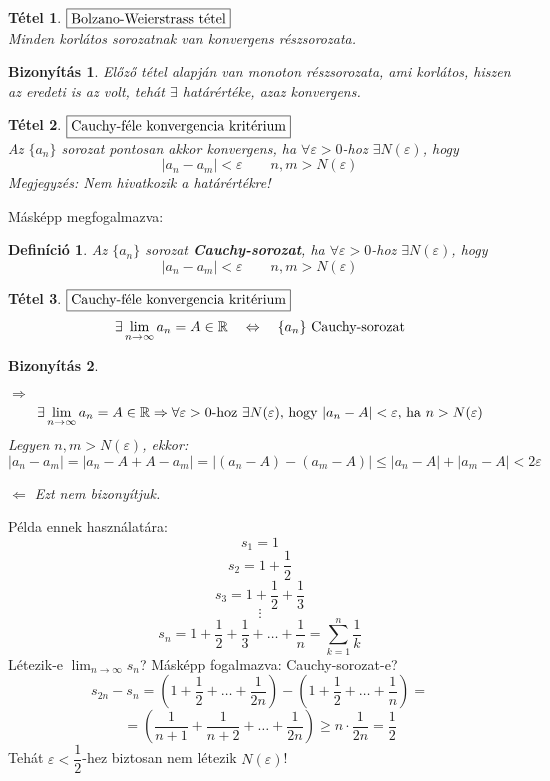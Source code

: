 \documentclass[a4paper,12pt,twoside]{book}
\newtheorem{tetel}{Tétel}[chapter]
\newtheorem{defi}{Definíció}[chapter]
\theoremstyle{break}
\newtheorem{biz}{Bizonyítás}[chapter]
\newtheorem{bizNL}[biz]{Bizonyítás}
\theoremstyle{plain}
\begin{document}
\begin{tetel} $\boxed{$Bolzano-Weierstrass tétel$}$\\
Minden korlátos sorozatnak van konvergens részsoro\-zata.
\end{tetel}
\begin{bizNL}
 Előző tétel alapján van monoton részsorozata, ami korlátos, hiszen az eredeti is az volt, tehát $\exists$ határértéke, azaz konvergens.
\end{bizNL}

\begin{tetel}
 $\boxed{$Cauchy-féle konvergencia kritérium$}$\\
 Az $\{a_n\}$ sorozat pontosan akkor konvergens, ha $\forall\varepsilon>0$-hoz $\exists N(\varepsilon)$, hogy
 \[|a_n-a_m|<\varepsilon \qquad n,m>N(\varepsilon)\]
 \emph{Megjegyzés}: Nem hivatkozik a határértékre!
\end{tetel}
\addtocounter{biz}{1}

Másképp megfogalmazva:
\begin{defi}
 Az $\{a_n\}$ sorozat \textbf{Cauchy-sorozat}, ha $\forall\varepsilon>0$-hoz $\exists N(\varepsilon)$, hogy
 \[|a_n-a_m|<\varepsilon \qquad n,m>N(\varepsilon)\]
\end{defi}
\begin{tetel}
 $\boxed{$Cauchy-féle konvergencia kritérium$}$\\
 \[\exists \lim_{n\to\infty} a_n = A\in\mathbb{R} \quad \Leftrightarrow \quad \{a_n\} \hbox{ Cauchy-sorozat}\]
\end{tetel}
\begin{biz}
 \begin{description*}
  \item[$\Rightarrow$] 
    \[\exists \lim_{n\to\infty} a_n = A\in\mathbb{R} \Rightarrow \forall \varepsilon>0 \hbox{-hoz } \exists N(\varepsilon) \hbox{, hogy } |a_n-A|<\varepsilon \hbox{, ha } n>N(\varepsilon)\]
  Legyen $n,m>N(\varepsilon)$, ekkor:
  \[|a_n-a_m| = |a_n-A+A-a_m| = |(a_n-A)-(a_m-A)| \leqslant |a_n-A|+|a_m-A| < 2\varepsilon\]
  \item[$\Leftarrow$] Ezt nem bizonyítjuk.
 \end{description*}
\end{biz}

Példa ennek használatára:
\[s_1 = 1\]
\[s_2 = 1+\frac{1}{2}\]
\[s_3 = 1+\frac{1}{2}+\frac{1}{3}\]
\[\vdots\]
\[s_n = 1+\frac{1}{2}+\frac{1}{3}+\ldots+\frac{1}{n} = \sum^{n}_{k=1} \frac{1}{k}\]
Létezik-e $\displaystyle \lim_{n\to\infty} s_n$? Másképp fogalmazva: Cauchy-sorozat-e?
\[s_{2n}-s_n = \left(1+\frac{1}{2}+\ldots+\frac{1}{2n}\right)-\left(1+\frac{1}{2}+\ldots+\frac{1}{n}\right) = \]
\[ = \left(\frac{1}{n+1}+\frac{1}{n+2}+\ldots+\frac{1}{2n}\right) \geqslant n\cdot\frac{1}{2n} = \frac{1}{2}\]
Tehát $\varepsilon < \dfrac{1}{2}$-hez biztosan nem létezik $N(\varepsilon)$!
\end{document}
